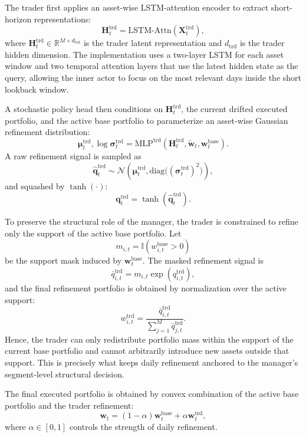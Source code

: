 \documentclass[letterpaper]{article} %
\begin{document}
The trader first applies an asset-wise LSTM-attention encoder to extract short-horizon representations:
\[
\mathbf{H}^{\mathrm{trd}}_t
=
\mathrm{LSTM\mbox{-}Attn}\!\left(\mathbf{X}^{\mathrm{trd}}_t\right),
\]
where \(\mathbf{H}^{\mathrm{trd}}_t\in\mathbb{R}^{M\times d_{\mathrm{trd}}}\) is the trader latent representation and \(d_{\mathrm{trd}}\) is the trader hidden dimension. The implementation uses a two-layer LSTM for each asset window and two temporal attention layers that use the latest hidden state as the query, allowing the inner actor to focus on the most relevant days inside the short lookback window.

A stochastic policy head then conditions on \(\mathbf{H}^{\mathrm{trd}}_t\), the current drifted executed portfolio, and the active base portfolio to parameterize an asset-wise Gaussian refinement distribution:
\[
\boldsymbol{\mu}^{\mathrm{trd}}_t,\log \boldsymbol{\sigma}^{\mathrm{trd}}_t
=
\mathrm{MLP}^{\mathrm{trd}}\!\left(
\mathbf{H}^{\mathrm{trd}}_t,
\tilde{\mathbf{w}}_t,
\mathbf{w}^{\mathrm{base}}_t
\right).
\]
A raw refinement signal is sampled as
\[
\hat{\mathbf{q}}^{\mathrm{trd}}_t
\sim
\mathcal{N}\!\left(
\boldsymbol{\mu}^{\mathrm{trd}}_t,
\mathrm{diag}\bigl((\boldsymbol{\sigma}^{\mathrm{trd}}_t)^2\bigr)
\right),
\]
and squashed by \(\tanh(\cdot)\):
\[
\mathbf{q}^{\mathrm{trd}}_t
=
\tanh\!\left(\hat{\mathbf{q}}^{\mathrm{trd}}_t\right).
\]

To preserve the structural role of the manager, the trader is constrained to refine only the support of the active base portfolio. Let
\[
m_{i,t}
=
\mathbb{I}\!\left(w_{i,t}^{\mathrm{base}}>0\right)
\]
be the support mask induced by \(\mathbf{w}^{\mathrm{base}}_t\). The masked refinement signal is
\[
\bar{q}_{i,t}^{\mathrm{trd}}
=
m_{i,t}\exp(q_{i,t}^{\mathrm{trd}}),
\]
and the final refinement portfolio is obtained by normalization over the active support:
\[
w_{i,t}^{\mathrm{trd}}
=
\frac{\bar{q}_{i,t}^{\mathrm{trd}}}
{\sum_{j=1}^{M}\bar{q}_{j,t}^{\mathrm{trd}}}.
\]
Hence, the trader can only redistribute portfolio mass within the support of the current base portfolio and cannot arbitrarily introduce new assets outside that support. This is precisely what keeps daily refinement anchored to the manager's segment-level structural decision.

The final executed portfolio is obtained by convex combination of the active base portfolio and the trader refinement:
\[
\mathbf{w}_t
=
(1-\alpha)\mathbf{w}^{\mathrm{base}}_t
+
\alpha\mathbf{w}^{\mathrm{trd}}_t,
\]
where \(\alpha\in[0,1]\) controls the strength of daily refinement.
\end{document}
